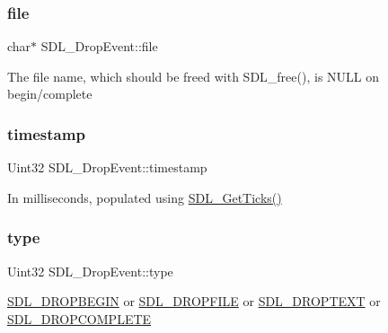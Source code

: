 \subsubsection{\texorpdfstring{file}{file}}
{\footnotesize\ttfamily char$\ast$ S\+D\+L\+\_\+\+Drop\+Event\+::file}

The file name, which should be freed with S\+D\+L\+\_\+free(), is N\+U\+LL on begin/complete \mbox{\label{struct_s_d_l___drop_event_a02d2c81bb22db632a40cd0021ff751ab}} 
\subsubsection{\texorpdfstring{timestamp}{timestamp}}
{\footnotesize\ttfamily Uint32 S\+D\+L\+\_\+\+Drop\+Event\+::timestamp}

In milliseconds, populated using \mbox{\hyperlink{_s_d_l__timer_8h_a0b9bc71d6287e0ffafdc3419760fe2b3}{S\+D\+L\+\_\+\+Get\+Ticks()}} \mbox{\label{struct_s_d_l___drop_event_a5ea27cfaa5f8d4940e9a69b68b3cc035}} 
\subsubsection{\texorpdfstring{type}{type}}
{\footnotesize\ttfamily Uint32 S\+D\+L\+\_\+\+Drop\+Event\+::type}

\mbox{\hyperlink{_s_d_l__events_8h_a3b589e89be6b35c02e0dd34a55f3fccaa0809886c132aaf734fff6f2abf466912}{S\+D\+L\+\_\+\+D\+R\+O\+P\+B\+E\+G\+IN}} or \mbox{\hyperlink{_s_d_l__events_8h_a3b589e89be6b35c02e0dd34a55f3fccaad9238862d7aeaebff88be6453ee0fbab}{S\+D\+L\+\_\+\+D\+R\+O\+P\+F\+I\+LE}} or \mbox{\hyperlink{_s_d_l__events_8h_a3b589e89be6b35c02e0dd34a55f3fccaa1d97f901333e40b0ccc4dff1a319213f}{S\+D\+L\+\_\+\+D\+R\+O\+P\+T\+E\+XT}} or \mbox{\hyperlink{_s_d_l__events_8h_a3b589e89be6b35c02e0dd34a55f3fccaaa83e80a89d5c4ff14889d07dddc402ef}{S\+D\+L\+\_\+\+D\+R\+O\+P\+C\+O\+M\+P\+L\+E\+TE}} \mbox{\label{struct_s_d_l___drop_event_a8cecd2178cdc04118bf852e7cf7bf647}} 
